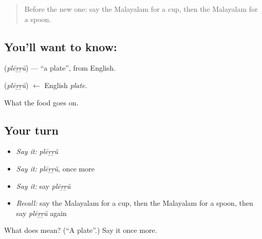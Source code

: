 \label{lesson:ML-C134-plate}



\begin{quote}
Before the new one: say the Malayalam for a cup, then the Malayalam for a spoon.
\end{quote}

\subsection*{You'll want to know: }
\textbf{} (\emph{plēṟṟŭ}) — \textquotedblleft{}a plate\textquotedblright{}, from English.

\begin{cousinweb}
\textbf{} (\emph{plēṟṟŭ}) $\leftarrow$ English \emph{plate}.
\end{cousinweb}

\begin{grammarlens}[title={What you've built}]
What the food goes on.
\end{grammarlens}

\subsection*{Your turn}
\begin{itemize}
\raggedright
  \item \emph{Say it:} \emph{plēṟṟŭ}
  \item \emph{Say it:} \emph{plēṟṟŭ}, once more
  \item \emph{Say it:} say \emph{plēṟṟŭ}
  \item \emph{Recall:} say the Malayalam for a cup, then the Malayalam for a spoon, then say \emph{plēṟṟŭ} again
\end{itemize}

\begin{tcolorbox}[breakable,colback=teal!4,colframe=teal!35!black,title={Before you move on}]
What does  mean? (\textquotedblleft{}A plate\textquotedblright{}.) Say it once more.
\end{tcolorbox}

